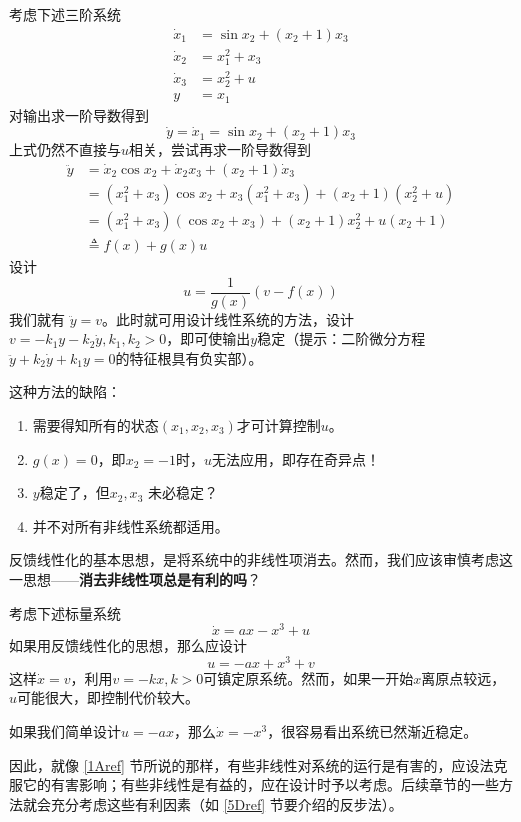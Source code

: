 \begin{example}
    考虑下述三阶系统
    \begin{align*}
  \dot{x}_1 & = \sin  x_2 + (x_2 + 1) x_3\\
  \dot{x}_2 & = x^2_1 + x_3\\
  \dot{x}_3 & = x^2_2 + u\\
  y & = x_1
\end{align*}
对输出求一阶导数得到
\[ \dot{y} = \dot{x}_1 = \sin  x_2 + (x_2 + 1) x_3 \]
上式仍然不直接与$u$相关，尝试再求一阶导数得到
\begin{align*}
  \ddot{y} & = \dot{x}_2 \cos  x_2 + \dot{x}_2 x_3 + (x_2 + 1) \dot{x}_3\\
  & = (x^2_1 + x_3) \cos  x_2 + x_3 (x^2_1 + x_3) + (x_2 + 1) (x^2_2 + u)\\
  & = (x^2_1 + x_3) (\cos  x_2 + x_3) + (x_2 + 1) x^2_2 + u (x_2 + 1)\\
  & \triangleq  f(x) + g(x)u
\end{align*}
设计 \[u = \frac{1}{g(x)} (v - f (x))\]
我们就有 $\ddot{y} = v$。此时就可用设计线性系统的方法，设计 $v = - k_1 y - k_2 \dot{y},k_1,k_2>0$，即可使输出$y$稳定（提示：二阶微分方程$\ddot{y}+k_2 \dot{y}+k_1 y=0$的特征根具有负实部）。
\end{example}

\begin{remark}  
    这种方法的缺陷：
  \begin{enumerate}
    \item 需要得知所有的状态$(x_1, x_2, x_3)$才可计算控制$u$。
    
    \item $g(x)=0$，即$x_2 = - 1$时，$u$无法应用，即存在奇异点！
    
    \item $y$稳定了，但$x_2, x_3$ 未必稳定？
    \item 并不对所有非线性系统都适用。
  \end{enumerate}
\end{remark}

反馈线性化的基本思想，是将系统中的非线性项消去。然而，我们应该审慎考虑这一思想——{\bf 消去非线性项总是有利的吗}？

\begin{example}
考虑下述标量系统
    \[\dot{x} = a  x - x^3 + u\]
如果用反馈线性化的思想，那么应设计\[u=-ax+x^3+v\]
这样$\dot{x}=v$，利用$v=-kx,k>0$可镇定原系统。然而，如果一开始$x$离原点较远，$u$可能很大，即控制代价较大。

如果我们简单设计$u=-ax$，那么$\dot{x}=-x^3$，很容易看出系统已然渐近稳定。

因此，就像 \ref{1Aref} 节所说的那样，有些非线性对系统的运行是有害的，应设法克服它的有害影响；有些非线性是有益的，应在设计时予以考虑。后续章节的一些方法就会充分考虑这些有利因素（如 \ref{5Dref} 节要介绍的反步法）。
\end{example}
